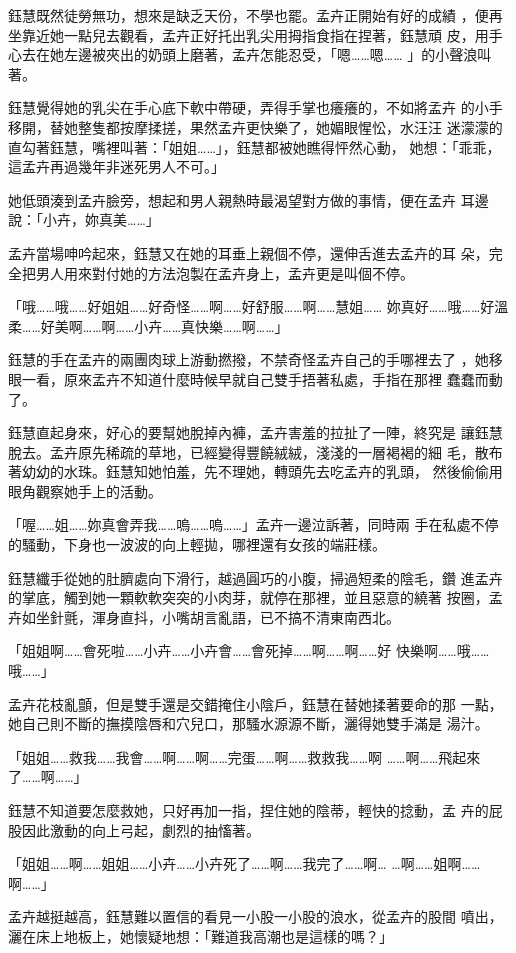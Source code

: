 鈺慧既然徒勞無功，想來是缺乏天份，不學也罷。孟卉正開始有好的成績
，便再坐靠近她一點兒去觀看，孟卉正好托出乳尖用拇指食指在捏著，鈺慧頑
皮，用手心去在她左邊被夾出的奶頭上磨著，孟卉怎能忍受，「嗯……嗯……
」的小聲浪叫著。

鈺慧覺得她的乳尖在手心底下軟中帶硬，弄得手掌也癢癢的，不如將孟卉
的小手移開，替她整隻都按摩揉搓，果然孟卉更快樂了，她媚眼惺忪，水汪汪
迷濛濛的直勾著鈺慧，嘴裡叫著：「姐姐……」，鈺慧都被她瞧得怦然心動，
她想：「乖乖，這孟卉再過幾年非迷死男人不可。」

她低頭湊到孟卉臉旁，想起和男人親熱時最渴望對方做的事情，便在孟卉
耳邊說：「小卉，妳真美……」

孟卉當場呻吟起來，鈺慧又在她的耳垂上親個不停，還伸舌進去孟卉的耳
朵，完全把男人用來對付她的方法泡製在孟卉身上，孟卉更是叫個不停。

「哦……哦……好姐姐……好奇怪……啊……好舒服……啊……慧姐……
妳真好……哦……好溫柔……好美啊……啊……小卉……真快樂……啊……」

鈺慧的手在孟卉的兩團肉球上游動撚撥，不禁奇怪孟卉自己的手哪裡去了
，她移眼一看，原來孟卉不知道什麼時候早就自己雙手捂著私處，手指在那裡
蠢蠢而動了。

鈺慧直起身來，好心的要幫她脫掉內褲，孟卉害羞的拉扯了一陣，終究是
讓鈺慧脫去。孟卉原先稀疏的草地，已經變得豐饒絨絨，淺淺的一層褐褐的細
毛，散布著幼幼的水珠。鈺慧知她怕羞，先不理她，轉頭先去吃孟卉的乳頭，
然後偷偷用眼角觀察她手上的活動。

「喔……姐……妳真會弄我……嗚……嗚……」孟卉一邊泣訴著，同時兩
手在私處不停的騷動，下身也一波波的向上輕拋，哪裡還有女孩的端莊樣。

鈺慧纖手從她的肚臍處向下滑行，越過圓巧的小腹，掃過短柔的陰毛，鑽
進孟卉的掌底，觸到她一顆軟軟突突的小肉芽，就停在那裡，並且惡意的繞著
按圈，孟卉如坐針氈，渾身直抖，小嘴胡言亂語，已不搞不清東南西北。

「姐姐啊……會死啦……小卉……小卉會……會死掉……啊……啊……好
快樂啊……哦……哦……」

孟卉花枝亂顫，但是雙手還是交錯掩住小陰戶，鈺慧在替她揉著要命的那
一點，她自己則不斷的撫摸陰唇和穴兒口，那騷水源源不斷，灑得她雙手滿是
湯汁。

「姐姐……救我……我會……啊……啊……完蛋……啊……救救我……啊
……啊……飛起來了……啊……」

鈺慧不知道要怎麼救她，只好再加一指，捏住她的陰蒂，輕快的捻動，孟
卉的屁股因此激動的向上弓起，劇烈的抽慉著。

「姐姐……啊……姐姐……小卉……小卉死了……啊……我完了……啊…
…啊……姐啊……啊……」

孟卉越挺越高，鈺慧難以置信的看見一小股一小股的浪水，從孟卉的股間
噴出，灑在床上地板上，她懷疑地想：「難道我高潮也是這樣的嗎？」

